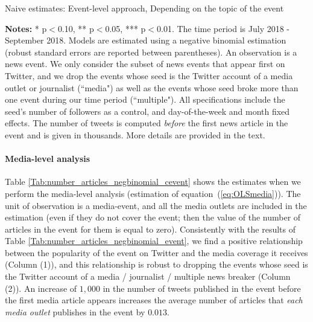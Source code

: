 \begin{table}
\caption{Naive estimates: Event-level approach, Depending on the topic of the event}
\begin{center}
	
\end{center}
\begin{spacing}{0.5}
	{\fns \textbf{Notes:} * p$<$0.10, ** p$<$0.05, *** p$<$0.01. The time period is July 2018 - September 2018.  Models are estimated using a negative binomial estimation (robust standard errors are reported between parentheses). An observation is a news event. We only consider the subset of news events that appear first on Twitter, and we drop the events whose seed is the Twitter account of a media outlet or journalist (``media") as well as the events whose seed broke more than one event during our time period (``multiple"). All specifications include the seed's number of followers as a control, and day-of-the-week and month fixed effects. The number of tweets is computed \textit{before} the first news article in the event and is given in thousands. More details are provided in the text.} 
\end{spacing}
\label{Tab:number_articles_negbinomial_event_category}
\end{table} 



\paragraph{Media-level analysis}

Table \ref{Tab:number_articles_negbinomial_cevent} shows the estimates when we perform the media-level analysis (estimation of equation~(\ref{eq:OLSmedia})). The unit of observation is a media-event, and all the media outlets are included in the estimation (even if they do not cover the event; then the value of the number of articles in the event for them is equal to zero). Consistently with the results of Table \ref{Tab:number_articles_negbinomial_event}, we find a positive relationship between the popularity of the event on Twitter and the media coverage it receives (Column (1)), and this relationship is robust to dropping the events whose seed is the Twitter account of a media / journalist / multiple news breaker (Column (2)). An increase of $1,000$ in the number of tweets published in the event before the first media article appears increases the average number of articles that \textit{each media outlet} publishes in the event by $0.013$.

